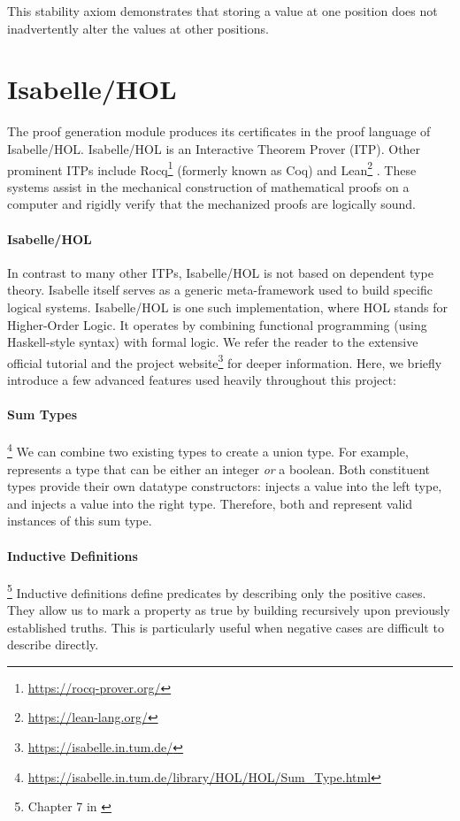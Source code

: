 This stability axiom demonstrates that storing a value at one position
does not inadvertently alter the values at other positions.


\section{Isabelle/HOL}
\label{sec:isabelle} 

The proof generation module produces its certificates in the proof language of Isabelle/HOL.
Isabelle/HOL is an Interactive Theorem Prover (ITP).
Other prominent ITPs include Rocq\footnote{\url{https://rocq-prover.org/}}
\cite{huet1997coq} (formerly known as Coq)
and Lean\footnote{\url{https://lean-lang.org/}} \cite{de2015lean}.
These systems assist in the mechanical construction of mathematical proofs on a computer
and rigidly verify that the mechanized proofs are logically sound.

\paragraph{Isabelle/HOL}
In contrast to many other ITPs, Isabelle/HOL is not based on dependent type theory.
Isabelle itself serves as a generic meta-framework used to build specific logical systems.
Isabelle/HOL is one such implementation, where HOL stands for Higher-Order Logic.
It operates by combining functional programming (using Haskell-style syntax) with formal logic.
We refer the reader to the extensive official tutorial \cite{nipkow2002isabelle}
and the project website\footnote{\url{https://isabelle.in.tum.de/}} for deeper information.
Here, we briefly introduce a few advanced features used heavily throughout this project:

\paragraph{Sum Types}\footnote{\url{https://isabelle.in.tum.de/library/HOL/HOL/Sum\_Type.html}}
We can combine two existing types to create a union type.
For example,  represents a type that can be either an integer \emph{or} a boolean.
Both constituent types provide their own datatype constructors:
 injects a value into the left type,
and  injects a value into the right type.
Therefore, both  and  represent valid instances of this sum type.

\paragraph{Inductive Definitions}\footnote{Chapter 7 in \cite{nipkow2002isabelle}}
Inductive definitions define predicates by describing only the positive cases.
They allow us to mark a property as true by building recursively upon previously established truths.
This is particularly useful when negative cases are difficult to describe directly.

